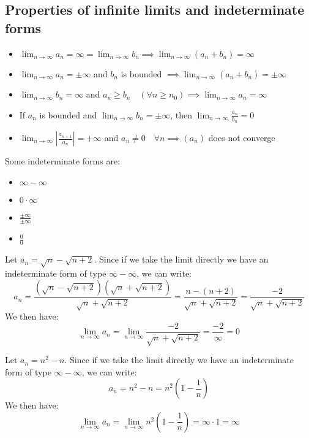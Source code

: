 \subsection{Properties of infinite limits and indeterminate forms}
\begin{itemize}[itemsep=1pt,label=$\circ$]
    \item $\lim_{n \to \infty} a_n = \infty = \lim_{n \to \infty} b_n \implies \lim_{n \to \infty} (a_n + b_n) = \infty$
    \item $\lim_{n \to \infty} a_n = \pm \infty$ and $b_n$ is bounded $\implies \lim_{n \to \infty} (a_n + b_n) = \pm \infty$
    \item $\lim_{n \to \infty} b_n = \infty$ and $a_n \geq b_n \quad (\forall n \geq n_0) \implies \lim_{n \to \infty} a_n = \infty$
    \item If $a_n$ is bounded and $\lim_{n \to \infty} b_n = \pm \infty$, then $\lim_{n \to \infty} \frac{a_n}{b_n} = 0$
    \item $\lim_{n \to \infty} \left|\frac{a_{n + 1}}{a_n}\right| = + \infty$ and $a_n \neq 0 \quad \forall n \implies (a_n)$ does not converge
\end{itemize}
Some indeterminate forms are:
\begin{itemize}[itemsep=1pt,label=$\circ$]
    \item $\infty - \infty$
    \item $0 \cdot \infty$
    \item $\frac{\pm \infty}{\pm \infty}$
    \item $\frac{0}{0}$
\end{itemize}
\begin{eg}
    Let $a_n = \sqrt{n} - \sqrt{n + 2}$. Since if we take the limit directly we have an indeterminate form of type $\infty - \infty$, we can write:
    \[ a_n = \frac{(\sqrt{n} - \sqrt{n + 2})(\sqrt{n} + \sqrt{n + 2})}{\sqrt{n} + \sqrt{n + 2}} = \frac{n - (n + 2)}{\sqrt{n} + \sqrt{n + 2}} = \frac{-2}{\sqrt{n} + \sqrt{n + 2}} \]
    We then have:
    \[ \lim_{n \to \infty} a_n = \lim_{n \to \infty} \frac{-2}{\sqrt{n} + \sqrt{n + 2}} = \frac{-2}{\infty} = 0 \]
\end{eg}
\begin{eg}
    Let $a_n = n^2 - n$. Since if we take the limit directly we have an indeterminate form of type $\infty - \infty$, we can write:
    \[ a_n = n^2 - n = n^2 \left(1 - \frac{1}{n}\right) \]
    We then have:
    \[ \lim_{n \to \infty} a_n = \lim_{n \to \infty} n^2 \left(1 - \frac{1}{n}\right) = \infty \cdot 1 = \infty \]
\end{eg}

